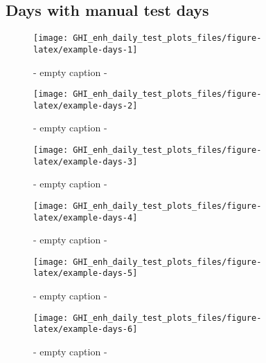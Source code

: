 \documentclass[
  10pt,
  a4paper,oneside]{article}
\begin{document}
\FloatBarrier

\subsection{Days with manual test days}\label{days-with-manual-test-days}

\begin{figure}[H]

{\centering \texttt{[image: GHI\_enh\_daily\_test\_plots\_files/figure-latex/example-days-1]} 

}

\caption{ - empty caption - }\label{fig:example-days-1}
\end{figure}

\begin{figure}[H]

{\centering \texttt{[image: GHI\_enh\_daily\_test\_plots\_files/figure-latex/example-days-2]} 

}

\caption{ - empty caption - }\label{fig:example-days-2}
\end{figure}

\begin{figure}[H]

{\centering \texttt{[image: GHI\_enh\_daily\_test\_plots\_files/figure-latex/example-days-3]} 

}

\caption{ - empty caption - }\label{fig:example-days-3}
\end{figure}

\begin{figure}[H]

{\centering \texttt{[image: GHI\_enh\_daily\_test\_plots\_files/figure-latex/example-days-4]} 

}

\caption{ - empty caption - }\label{fig:example-days-4}
\end{figure}

\begin{figure}[H]

{\centering \texttt{[image: GHI\_enh\_daily\_test\_plots\_files/figure-latex/example-days-5]} 

}

\caption{ - empty caption - }\label{fig:example-days-5}
\end{figure}

\begin{figure}[H]

{\centering \texttt{[image: GHI\_enh\_daily\_test\_plots\_files/figure-latex/example-days-6]} 

}

\caption{ - empty caption - }\label{fig:example-days-6}
\end{figure}
\end{document}
